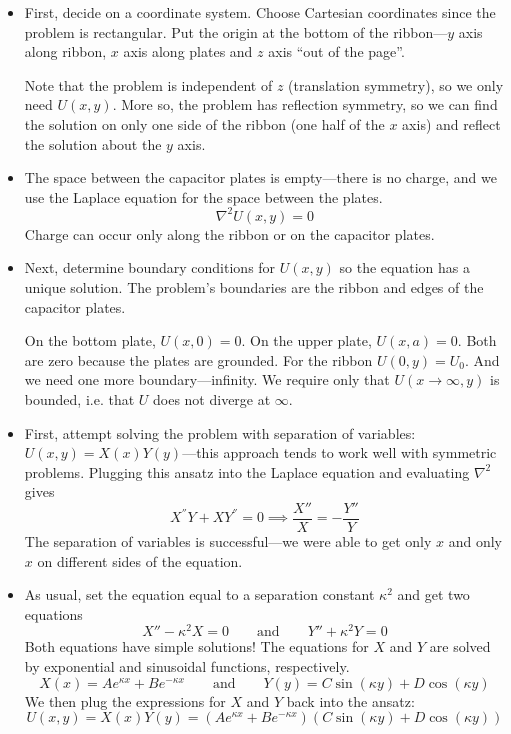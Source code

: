 \documentclass[11pt, a4paper]{article}
\newcommand{\eqtext}[1]{\qquad \text{#1} \qquad}
\renewcommand{\laplacian}{\nabla^{2}}
\begin{document}
\begin{itemize}
	\item First, decide on a coordinate system. Choose Cartesian coordinates since the problem is rectangular. Put the origin at the bottom of the ribbon---$ y $ axis along ribbon, $ x $ axis along plates and $ z $ axis ``out of the page''. 
	
	Note that the problem is independent of $ z $ (translation symmetry), so we only need $ U(x, y) $. More so, the problem has reflection symmetry, so we can find the solution on only one side of the ribbon (one half of the $ x $ axis) and reflect the solution about the $ y $ axis.
	
	\item The space between the capacitor plates is empty---there is no charge, and we use the Laplace equation for the space between the plates.
	\begin{equation*}
		\laplacian U(x, y) = 0
	\end{equation*}
	Charge can occur only along the ribbon or on the capacitor plates.
	
	\item Next, determine boundary conditions for $ U(x, y) $ so the equation has a unique solution. The problem's boundaries are the ribbon and edges of the capacitor plates.
	
	On the bottom plate, $ U(x, 0) = 0 $. On the upper plate, $ U(x, a) = 0 $. Both are zero because the plates are grounded. For the ribbon $ U(0, y) = U_{0} $. And we need one more boundary---infinity. We require only that $ U(x \to \infty, y) $ is bounded, i.e. that $ U $ does not diverge at $ \infty $. 
	
	\item First, attempt solving the problem with separation of variables: $ U(x, y) = X(x)Y(y) $---this approach tends to work well with symmetric problems. Plugging this ansatz into the Laplace equation and evaluating $ \laplacian $ gives
	\begin{equation*}
		X^{''}Y + XY^{''} = 0 \implies \frac{X''}{X} = - \frac{Y''}{Y}
	\end{equation*}
	The separation of variables is successful---we were able to get only $ x $ and only $ x $ on different sides of the equation. 
	
	\item As usual, set the equation equal to a separation constant $ \kappa^{2} $ and get two equations
	\begin{equation*}
		X'' - \kappa^{2}X = 0 \eqtext{and} Y'' + \kappa^{2} Y = 0
	\end{equation*}
	Both equations have simple solutions! The equations for $ X $ and $ Y $ are solved by exponential and sinusoidal functions, respectively.
	\begin{equation*}
		X(x) = Ae^{\kappa x} + Be^{-\kappa x} \eqtext{and} Y(y) = C\sin(\kappa y) + D\cos (\kappa y)
	\end{equation*}
	We then plug the expressions for $ X $ and $ Y $ back into the ansatz:
	\begin{equation*}
		U(x, y)  = X(x)Y(y) = \left(Ae^{\kappa x} + Be^{-\kappa x}\right)\left(C\sin(\kappa y) + D\cos (\kappa y)\right)
	\end{equation*}
	

\end{itemize}
\end{document}
